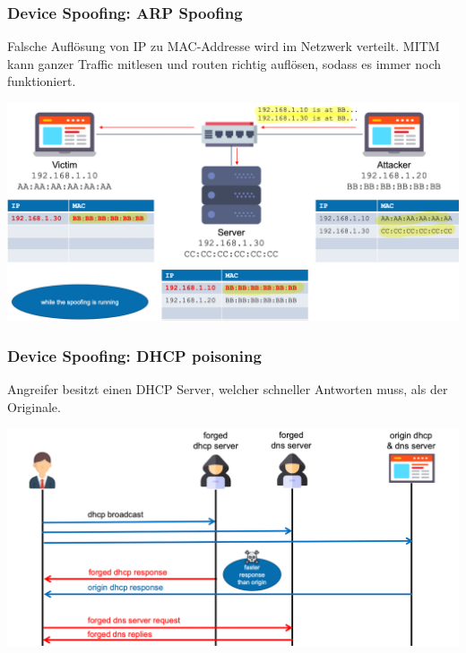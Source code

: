 \subsubsection{Device Spoofing: ARP Spoofing}
Falsche Auflösung von IP zu MAC-Addresse wird im Netzwerk verteilt. MITM kann ganzer Traffic mitlesen und routen richtig auflösen, sodass es immer noch funktioniert.
\begin{center}
    \vspace{-4pt}
    \includegraphics[width=1\linewidth]{./img/09-mitm/arp}
    \vspace{-8pt}
\end{center}
\vspace{-8pt}

\subsubsection{Device Spoofing: DHCP poisoning}
Angreifer besitzt einen DHCP Server, welcher schneller Antworten muss, als der Originale.
\begin{center}
    \vspace{-8pt}
    \includegraphics[width=1.0\linewidth]{./img/09-mitm/dhcp}
    \vspace{-8pt}
\end{center}

